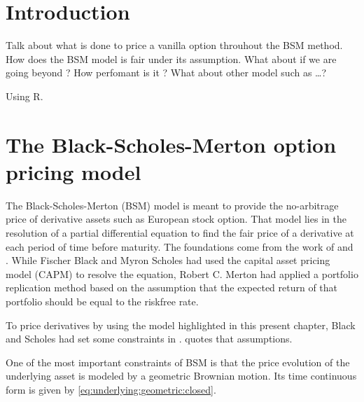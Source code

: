 \documentclass[12pt]{report}
\newcommand{\BSM}{Black--Scholes--Merton }
\begin{document}

\tableofcontents{}



%
%
\chapter*{Introduction}
\label{cha:Introduction}

Talk about what is done to price a vanilla option throuhout the BSM method.
How does the BSM model is fair under its assumption. What about if we are going beyond ?
How perfomant is it ? 
What about other model such as \ldots ?

Using R. \cite{R}
%
%
\chapter{The Black-Scholes-Merton option pricing model}
\label{cha:bsm}

The Black-Scholes-Merton (BSM) model is meant to provide the no-arbitrage price of derivative assets such as European stock option. 
That model lies in the resolution of a partial differential equation to find the fair price of a derivative at each period of time before maturity.
The foundations come from the work of \citet{bs} and \citet{merton73}. 
While Fischer Black and Myron Scholes had used the capital asset pricing model (CAPM) to resolve the equation, Robert C. Merton had applied a portfolio replication method based on the assumption that the expected return of that portfolio should be equal to the riskfree rate. 



To price derivatives by using the model highlighted in this present chapter, Black and Scholes had set some constraints in \citet{bs}. 
 quotes that assumptions. 


  
One of the most important constraints of BSM is that the price evolution of the underlying asset is modeled by a geometric Brownian motion. Its time continuous form is given by  \cref{eq:underlying:geometric:closed}.
\end{document}
